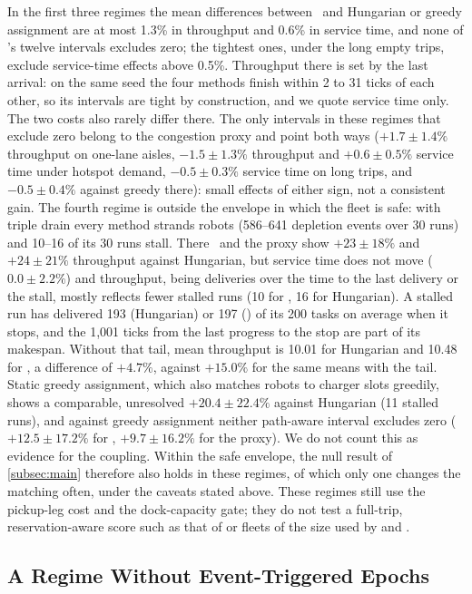 In the first three regimes the mean differences between \sname\ and
Hungarian or greedy assignment are at most 1.3\% in throughput and 0.6\% in
service time, and none of \sname's twelve intervals excludes zero; the
tightest ones, under the long empty trips, exclude service-time effects above 0.5\%.
Throughput there is set by the last arrival: on the same seed the four methods finish
within 2 to 31 ticks of each other, so its intervals are tight by construction, and we
quote service time only. The two costs also rarely differ there.
The only intervals in these regimes that exclude zero belong to the
congestion proxy and point both ways ($+1.7\pm1.4\%$ throughput on one-lane
aisles, $-1.5\pm1.3\%$ throughput and $+0.6\pm0.5\%$ service time under
hotspot demand, $-0.5\pm0.3\%$ service time on long trips, and
$-0.5\pm0.4\%$ against greedy there): small effects of either sign, not a
consistent gain. The
fourth regime is outside the envelope in which the fleet is safe: with
triple drain every method strands robots (586--641 depletion events over
30 runs) and 10--16 of its 30 runs stall. There \sname\ and the proxy show
$+23\pm18\%$ and $+24\pm21\%$ throughput against Hungarian, but service
time does not move ($0.0\pm2.2\%$) and throughput, being deliveries over the
time to the last delivery or the stall, mostly reflects fewer stalled runs
(10 for \sname, 16 for Hungarian). A stalled run has delivered 193 (Hungarian) or 197
(\sname) of its 200 tasks on average when it stops, and the 1{,}001 ticks from the last
progress to the stop are part of its makespan. Without that tail, mean throughput is
10.01 for Hungarian and 10.48 for \sname, a difference of $+4.7\%$, against $+15.0\%$
for the same means with the tail. Static greedy assignment, which also
matches robots to charger slots greedily, shows a comparable, unresolved $+20.4\pm22.4\%$ against Hungarian (11 stalled runs),
and against greedy assignment neither path-aware interval excludes zero
($+12.5\pm17.2\%$ for \sname, $+9.7\pm16.2\%$ for the proxy). We do not
count this as evidence for the coupling. Within the safe envelope, the null result of \cref{subsec:main}
therefore also holds in these regimes, of which only one changes the
matching often, under the caveats stated above. These regimes still use
the pickup-leg cost and the dock-capacity gate; they do not test a
full-trip, reservation-aware score such as that of \citet{hirayama2026detour}
or fleets of the size used by \citet{zhang2026flow} and
\citet{gaber2026grand}.

\subsection{A Regime Without Event-Triggered Epochs}\label{subsec:nondeg}


